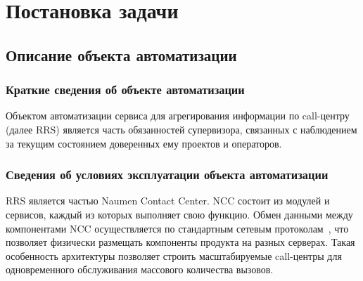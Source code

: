 \chapter{Постановка задачи}
\label{ch:requirements}
%
%

\section{Описание объекта автоматизации}

\subsection{Краткие сведения об объекте автоматизации}

Объектом автоматизации сервиса для агрегирования информации по call-центру (далее RRS) является часть обязанностей супервизора,
связанных с наблюдением за текущим состоянием доверенных ему проектов и операторов.

\subsection{Сведения об условиях эксплуатации объекта автоматизации}

RRS является частью Naumen Contact Center.
NCC состоит из модулей и сервисов, каждый из которых выполняет свою функцию.
Обмен данными между компонентами NCC осуществляется по стандартным сетевым протоколам~\cite{book:internet},
что позволяет физически размещать компоненты продукта на разных серверах.
Такая особенность архитектуры позволяет строить масштабируемые call-центры
для одновременного обслуживания массового количества вызовов.

